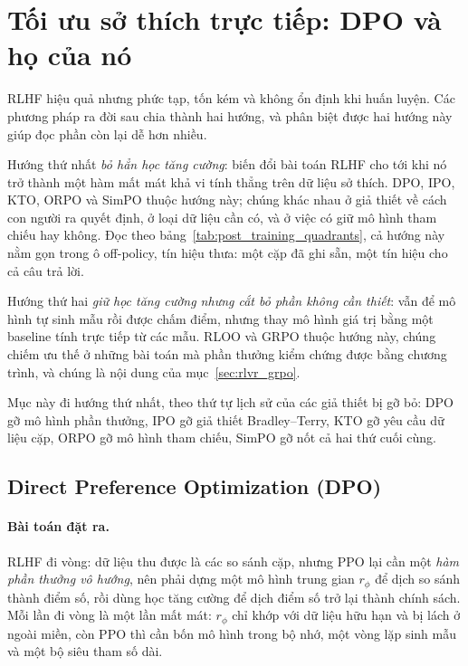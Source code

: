 
\section{Tối ưu sở thích trực tiếp: DPO và họ của nó}
\label{sec:direct_preference}
\label{ssec:rlhf_alternatives}
RLHF hiệu quả nhưng phức tạp, tốn kém và không ổn định khi huấn luyện. Các phương pháp ra đời sau chia thành hai hướng, và phân biệt được hai hướng này giúp đọc phần còn lại dễ hơn nhiều.

Hướng thứ nhất \emph{bỏ hẳn học tăng cường}: biến đổi bài toán RLHF cho tới khi nó trở thành một hàm mất mát khả vi tính thẳng trên dữ liệu sở thích. DPO, IPO, KTO, ORPO và SimPO thuộc hướng này; chúng khác nhau ở giả thiết về cách con người ra quyết định, ở loại dữ liệu cần có, và ở việc có giữ mô hình tham chiếu hay không. Đọc theo bảng~\ref{tab:post_training_quadrants}, cả hướng này nằm gọn trong ô off-policy, tín hiệu thưa: một cặp đã ghi sẵn, một tín hiệu cho cả câu trả lời.

Hướng thứ hai \emph{giữ học tăng cường nhưng cắt bỏ phần không cần thiết}: vẫn để mô hình tự sinh mẫu rồi được chấm điểm, nhưng thay mô hình giá trị bằng một baseline tính trực tiếp từ các mẫu. RLOO và GRPO thuộc hướng này, chúng chiếm ưu thế ở những bài toán mà phần thưởng kiểm chứng được bằng chương trình, và chúng là nội dung của mục~\ref{sec:rlvr_grpo}.

Mục này đi hướng thứ nhất, theo thứ tự lịch sử của các giả thiết bị gỡ bỏ: DPO gỡ mô hình phần thưởng, IPO gỡ giả thiết Bradley--Terry, KTO gỡ yêu cầu dữ liệu cặp, ORPO gỡ mô hình tham chiếu, SimPO gỡ nốt cả hai thứ cuối cùng.

\subsection{Direct Preference Optimization (DPO)}
\label{ssec:dpo}

\paragraph{Bài toán đặt ra.}
RLHF đi vòng: dữ liệu thu được là các so sánh cặp, nhưng PPO lại cần một \emph{hàm phần thưởng vô hướng}, nên phải dựng một mô hình trung gian \( r_{\phi} \) để dịch so sánh thành điểm số, rồi dùng học tăng cường để dịch điểm số trở lại thành chính sách. Mỗi lần đi vòng là một lần mất mát: \( r_{\phi} \) chỉ khớp với dữ liệu hữu hạn và bị lách ở ngoài miền, còn PPO thì cần bốn mô hình trong bộ nhớ, một vòng lặp sinh mẫu và một bộ siêu tham số dài.

